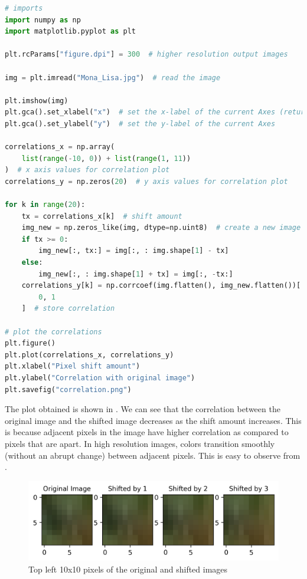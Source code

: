 \begin{lstlisting}[language=Python, caption={Python code to compute and plot the correlations of the shifted images}, label=lst:correlation]
# imports
import numpy as np
import matplotlib.pyplot as plt

plt.rcParams["figure.dpi"] = 300  # higher resolution output images

img = plt.imread("Mona_Lisa.jpg")  # read the image

plt.imshow(img)
plt.gca().set_xlabel("x")  # set the x-label of the current Axes (returned by the gca)
plt.gca().set_ylabel("y")  # set the y-label of the current Axes

correlations_x = np.array(
    list(range(-10, 0)) + list(range(1, 11))
)  # x axis values for correlation plot
correlations_y = np.zeros(20)  # y axis values for correlation plot

for k in range(20):
    tx = correlations_x[k]  # shift amount
    img_new = np.zeros_like(img, dtype=np.uint8)  # create a new image
    if tx >= 0:
        img_new[:, tx:] = img[:, : img.shape[1] - tx]
    else:
        img_new[:, : img.shape[1] + tx] = img[:, -tx:]
    correlations_y[k] = np.corrcoef(img.flatten(), img_new.flatten())[
        0, 1
    ]  # store correlation

# plot the correlations
plt.figure()
plt.plot(correlations_x, correlations_y)
plt.xlabel("Pixel shift amount")
plt.ylabel("Correlation with original image")
plt.savefig("correlation.png")
\end{lstlisting}

The plot obtained is shown in .
We can see that the correlation between the original image and the shifted image decreases as the shift amount increases.
This is because adjacent pixels in the image have higher correlation as compared to pixels that are apart. In high resolution images, colors transition smoothly (without an abrupt change) between adjacent pixels.
This is easy to observe from .


\begin{figure}[H]
	\centering
	\includegraphics{img/shifted_images.png}
	\caption{Top left 10x10 pixels of the original and shifted images}
	\label{fig:shifted_images}
\end{figure}

